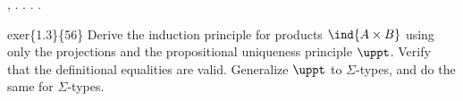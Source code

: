 \begin{coqdoccode}
\coqdocnoindent
{} \coqdockw{\ensuremath{\forall}}    ,    \coqdocnotation{(}\coqdocnotation{;} \coqdocnotation{)} \coqdocnotation{=}   . . .\coqdoceol
\coqdocemptyline
\coqdocnoindent
{} .\coqdoceol
\coqdocemptyline
\end{coqdoccode}
exer\{1.3\}\{56\} Derive the induction principle for products $\ind{A \times B}$
using only the projections and the propositional uniqueness principle $\uppt$.
Verify that the definitional equalities are valid.  Generalize $\uppt$ to
$\Sigma$-types, and do the same for $\Sigma$-types.


